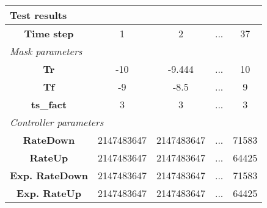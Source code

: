 \vspace{1em}
\begin{tabularx}{\textwidth}{|c|c|c|>{\centering\arraybackslash}X|c|}
\hline
\multicolumn{5}{|l|}{\cellcolor[gray]{0.8}\textbf{Test results}} \tabularnewline \hline
\textbf{Time step} & 1 & 2 & ... & 37 \tabularnewline \hline
\multicolumn{5}{|l|}{\cellcolor[gray]{0.9}\textit{Mask parameters}} \tabularnewline \hline
\textbf{Tr} & -10 & -9.444 & ... & 10 \tabularnewline \hline
\textbf{Tf} & -9 & -8.5 & ... & 9 \tabularnewline \hline
\textbf{ts\_fact} & 3 & 3 & ... & 3 \tabularnewline \hline
\multicolumn{5}{|l|}{\cellcolor[gray]{0.9}\textit{Controller parameters}} \tabularnewline \hline
\textbf{RateDown} & 2147483647 & 2147483647 & ... & 71583 \tabularnewline \hline
\textbf{RateUp} & 2147483647 & 2147483647 & ... & 64425 \tabularnewline \hline
\textbf{Exp. RateDown} & 2147483647 & 2147483647 & ... & 71583 \tabularnewline \hline
\textbf{Exp. RateUp} & 2147483647 & 2147483647 & ... & 64425 \tabularnewline \hline
\end{tabularx}
\vspace{1ex}
